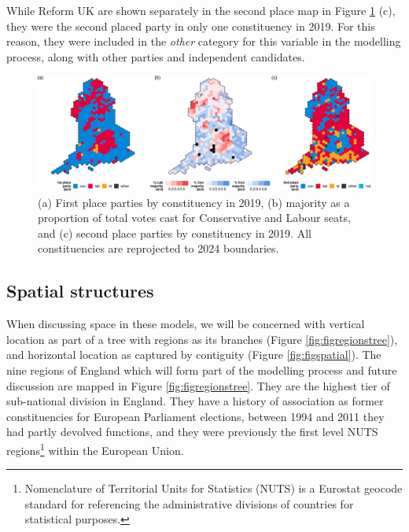 \documentclass[webpdf,large,contemporary,namedate]{oup-authoring-template}
\theoremstyle{thmstyleone}
\theoremstyle{thmstyletwo}
\theoremstyle{thmstylethree}
\begin{document}
While Reform UK are shown separately in the second place map in Figure
\ref{fig:figplacement} (c), they were the second placed party in only
one constituency in 2019. For this reason, they were included in the
\emph{other} category for this variable in the modelling process, along
with other parties and independent candidates.

\begin{figure}[th]
\includegraphics[width=1\linewidth]{jrss_resubmission_files/figure-latex/figplacement-1} \caption{(a) First place parties by constituency in 2019, (b) majority as a proportion of total votes cast for Conservative and Labour seats, and (c) second place parties by constituency in 2019. All constituencies are reprojected to 2024 boundaries.}\label{fig:figplacement}
\end{figure}

\subsection{Spatial structures}\label{spatial-structures}

When discussing space in these models, we will be concerned with
vertical location as part of a tree with regions as its branches (Figure
\ref{fig:figregionstree}), and horizontal location as captured by
contiguity (Figure \ref{fig:figspatial}). The nine regions of England
which will form part of the modelling process and future discussion are
mapped in Figure \ref{fig:figregionstree}. They are the highest tier of
sub-national division in England. They have a history of association as
former constituencies for European Parliament elections, between 1994
and 2011 they had partly devolved functions, and they were previously
the first level NUTS regions\footnote{Nomenclature of Territorial Units
  for Statistics (NUTS) is a Eurostat geocode standard for referencing
  the administrative divisions of countries for statistical purposes.}
within the European Union.
\end{document}
